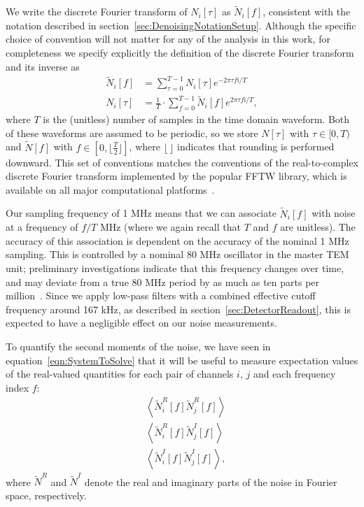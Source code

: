 We write the discrete Fourier transform of $N_i[\tau]$ as $\widetilde{N}_i[f]$, consistent with the notation described in section~\ref{sec:DenoisingNotationSetup}.  Although the specific choice of convention will not matter for any of the analysis in this work, for completeness we specify explicitly the definition of the discrete Fourier transform and its inverse as
\begin{align}
\widetilde{N}_i[f] &= \sum_{\tau = 0}^{T-1} N_i[\tau] e^{-2\pi \tau f \mathrm{i}/T}\label{eqn:NoiseChapterDefnFourierTransform}\\
N_i[\tau] &= \frac{1}{T}\cdot \sum_{f = 0}^{T-1} \widetilde{N}_i[f] e^{2\pi \tau f \mathrm{i}/T},
\end{align}
where $T$ is the (unitless) number of samples in the time domain waveform.  Both of these waveforms are assumed to be periodic, so we store $N[\tau]$ with $\tau \in [0, T)$ and $\widetilde{N}[f]$ with $f \in \left[0, \lfloor \frac{T}{2} \rfloor\right]$, where $\lfloor\,\rfloor$ indicates that rounding is performed downward.  This set of conventions matches the conventions of the real-to-complex discrete Fourier transform implemented by the popular FFTW library, which is available on all major computational platforms~\cite{FFTW05}.

Our sampling frequency of 1 MHz means that we can associate $\widetilde{N}_i[f]$ with noise at a frequency of $f/T$ MHz (where we again recall that $T$ and $f$ are unitless).  The accuracy of this association is dependent on the accuracy of the nominal 1 MHz sampling.  This is controlled by a nominal 80 MHz oscillator in the master TEM unit; preliminary investigations indicate that this frequency changes over time, and may deviate from a true 80 MHz period by as much as ten parts per million~\cite{DAQWeirdDetails,EXOElectronicsFunctionalSpecification}.  Since we apply low-pass filters with a combined effective cutoff frequency around 167 kHz, as described in section~\ref{sec:DetectorReadout}, this is expected to have a negligible effect on our noise measurements.

To quantify the second moments of the noise, we have seen in equation~\ref{eqn:SystemToSolve} that it will be useful to measure expectation values of the real-valued quantities for each pair of channels $i$, $j$ and each frequency index $f$:
\begin{subequations}\label{eq:NoiseChapterAllExpValues}\begin{align}
&\left<\widetilde{N}^R_i[f]\widetilde{N}^R_j[f]\right>\label{eq:NoiseChapterFirstExpValue}\\
&\left<\widetilde{N}^R_i[f]\widetilde{N}^I_j[f]\right>\label{eq:NoiseChapterSecondExpValue}\\
&\left<\widetilde{N}^I_i[f]\widetilde{N}^I_j[f]\right>\label{eq:NoiseChapterThirdExpValue},
\end{align}\end{subequations}
where $\widetilde{N}^R$ and $\widetilde{N}^I$ denote the real and imaginary parts of the noise in Fourier space, respectively.

